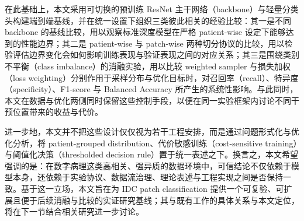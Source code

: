 在此基础上，本文采用可切换的预训练 ResNet 主干网络（backbone）与轻量分类头构建端到端基线，并在统一设置下组织三类彼此相关的经验比较：其一是不同 backbone 的基线比较，用以观察标准深度模型在严格 patient-wise 设定下能够达到的性能边界；其二是 patient-wise 与 patch-wise 两种切分协议的比较，用以检验评估边界变化会如何影响训练表现与验证表现之间的对应关系；其三是围绕类别不平衡（class imbalance）的消融实验，用以比较 weighted sampler 与损失加权（loss weighting）分别作用于采样分布与优化目标时，对召回率（recall）、特异度（specificity）、F1-score 与 Balanced Accuracy 所产生的系统性影响。与此同时，本文在数据与优化两侧同时保留这些控制手段，以便在同一实验框架内讨论不同干预位置带来的收益与代价。

进一步地，本文并不把这些设计仅仅视为若干工程安排，而是通过问题形式化与优化分析，将 patient-grouped distribution、代价敏感训练（cost-sensitive training）与阈值化决策（thresholded decision rule）置于统一表述之下。换言之，本文希望强调的是：在数字病理这类高相关、强异质的数据环境中，可信结论不仅依赖于模型本身，还依赖于实验协议、数据流治理、理论表述与工程实现之间是否保持一致。基于这一立场，本文旨在为 IDC patch classification 提供一个可复验、可扩展且便于后续消融与比较的实证研究基线；其与既有工作的具体关系与本文定位，将在下一节结合相关研究进一步讨论。
